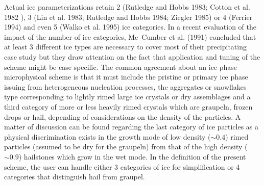 Actual ice parameterizations retain 2 (Rutledge and Hobbs 1983; Cotton et al.
1982\footnotemark
{}
), 3 (Lin et al. 1983; Rutledge and Hobbs 1984; Ziegler 1985) or 4
(Ferrier 1994) and even 5 (Walko et al. 1995) ice categories. In a recent
evaluation of the impact of the number of ice categories, Mc~Cumber et al.
(1991) concluded that at least 3 different ice types are necessary to cover most
of their precipitating case study but they
draw attention on the fact that application and tuning of the scheme might be
case specific. The common agreement about an ice phase microphysical scheme is
that it must include the pristine or primary ice phase issuing from
heterogeneous nucleation processes, the aggregates or snowflakes type
corresponding to lightly rimed large ice crystals or dry assemblages
and a third category of more or less heavily rimed crystals which are
graupeln, frozen drops or hail, depending of considerations on the density of
the particles. A matter of discussion can be found regarding the last category
of ice particles as a physical discrimination exists in the growth mode of
low density ($\sim 0.4$) rimed particles (assumed to be dry for the graupeln)
from that of the high density ($\sim 0.9$) hailstones which grow in the wet
mode. In the definition of the present scheme, the user can handle either 3 categories of ice for simplification or 4 categories that distinguish hail from graupel.

